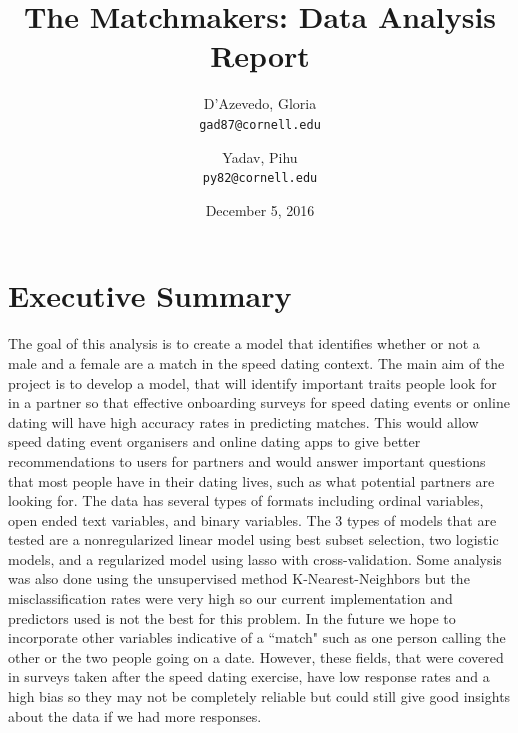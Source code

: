 \documentclass{article}
\title{The Matchmakers: Data Analysis Report}
\author{
  D'Azevedo, Gloria\\
  \texttt{gad87@cornell.edu}
  \and
  Yadav, Pihu\\
  \texttt{py82@cornell.edu}
}
\date{December 5, 2016}
\begin{document}
\maketitle

\section{Executive Summary}
The goal of this analysis is to create a model that identifies whether or not a male and a female are a match in the speed dating context. The main aim of the project is to develop a model, that will identify important traits people look for in a partner so that effective onboarding surveys for speed dating events or online dating will have high accuracy rates in predicting matches. This would allow speed dating event organisers and online dating apps to give better recommendations to users for partners and would answer important questions that most people have in their dating lives, such as what potential partners are looking for.  The data has several types of formats including ordinal variables, open ended text variables, and binary variables.  The 3 types of models that are tested are a nonregularized linear model using best subset selection, two logistic models, and a regularized model using lasso with cross-validation.  Some analysis was also done using the unsupervised method K-Nearest-Neighbors but the misclassification rates were very high so our current implementation and predictors used is not the best for this problem.  In the future we hope to incorporate other variables indicative of a ``match" such as one person calling the other or the two people going on a date.  However, these fields, that were covered in surveys taken after the speed dating exercise, have low response rates and a high bias so they may not be completely reliable but could still give good insights about the data if we had more responses. 
\end{document}
